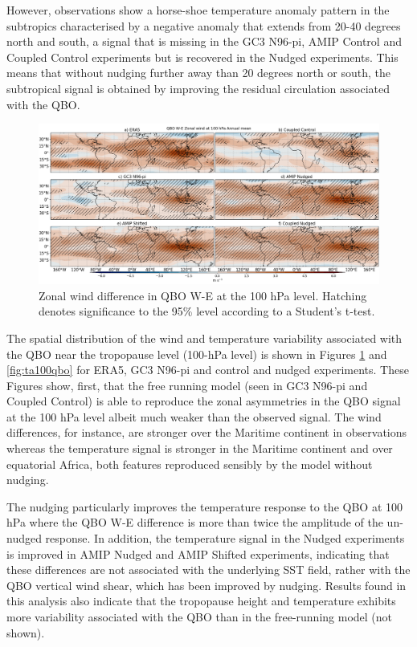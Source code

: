 However, observations show a horse-shoe temperature anomaly pattern in the subtropics characterised by a negative anomaly that extends from 20-40 degrees north and south, a signal that is missing in the GC3 N96-pi, AMIP Control and Coupled Control experiments but is recovered in the Nudged experiments. This means that without nudging further away than 20 degrees north or south, the subtropical signal is obtained by improving the residual circulation associated with the QBO. 

\begin{figure}[t!]
\centering
 \includegraphics[width=\linewidth]{figures/ua100climqbowf.png}
\caption[Zonal wind QBO W-E difference 100 hPa level]{Zonal wind difference in QBO W-E at the 100 hPa level. Hatching denotes significance to the 95\% level according to a Student's t-test.}
\label{fig:ua100qbo}
\end{figure}

The spatial distribution of the wind and temperature variability associated with the QBO near the tropopause level (100-hPa level) is shown in Figures \ref{fig:ua100qbo} and \ref{fig:ta100qbo} for ERA5, GC3 N96-pi and control and nudged experiments. 
These Figures show, first, that the free running model (seen in GC3 N96-pi and Coupled Control) is able to reproduce the zonal asymmetries in the QBO signal \citep{tegtmeier2020b} at the 100 hPa level albeit much weaker than the observed signal. The wind differences, for instance, are stronger over the Maritime continent in observations whereas the temperature signal is stronger in the Maritime continent and over equatorial Africa, both features reproduced sensibly by the model without nudging. 

The nudging particularly improves the temperature response to the QBO at 100 hPa where the QBO W-E difference is more than twice the amplitude of the un-nudged response. 
In addition, the temperature signal in the Nudged experiments is improved in AMIP Nudged and AMIP Shifted experiments, indicating that these differences are not associated with the underlying SST field, rather with the QBO vertical wind shear, which has been improved by nudging. 
Results found in this analysis also indicate that the tropopause height and temperature exhibits more variability associated with the QBO than in the free-running model (not shown). 


